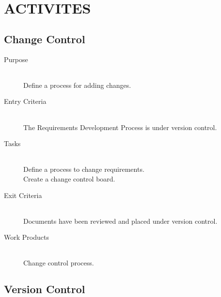 \documentclass[11pt]{article}
\begin{document}
\section{ACTIVITES}

\subsection{Change Control}

\begin{description}

\item[Purpose] \hfill \\
Define a process for adding changes.

\item[Entry Criteria]\hfill \\
The Requirements Development Process is under version control.

\item[Tasks]\hfill \\
Define a process to change requirements. \\
Create a change control board.

\item[Exit Criteria]\hfill \\
Documents have been reviewed and placed under version control.

\item[Work Products]\hfill \\
Change control process.\\

\end{description}

\newpage
\subsection{Version Control}
\end{document}

